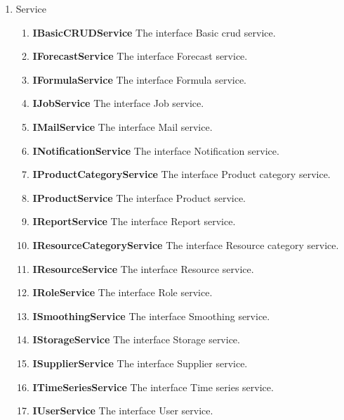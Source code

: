 \documentclass[a4paper,11pt,twoside]{report}
\theoremstyle{definition}
\begin{document}
\begin{enumerate}
\begin{enumerate}
\end{enumerate} 
\item Service	 
\begin{enumerate} 
\item \textbf{IBasicCRUDService} The interface Basic crud service.
\item \textbf{IForecastService} The interface Forecast service.
\item \textbf{IFormulaService} The interface Formula service.
\item \textbf{IJobService} The interface Job service.
\item \textbf{IMailService} The interface Mail service.
\item \textbf{INotificationService} The interface Notification service.
\item \textbf{IProductCategoryService} The interface Product category service.
\item \textbf{IProductService} The interface Product service.
\item \textbf{IReportService} The interface Report service.
\item \textbf{IResourceCategoryService} The interface Resource category service.
\item \textbf{IResourceService} The interface Resource service.
\item \textbf{IRoleService} The interface Role service.
\item \textbf{ISmoothingService} The interface Smoothing service.
\item \textbf{IStorageService} The interface Storage service.
\item \textbf{ISupplierService} The interface Supplier service.
\item \textbf{ITimeSeriesService} The interface Time series service.
\item \textbf{IUserService} The interface User service.


\end{enumerate}
\end{enumerate}
\end{document}
